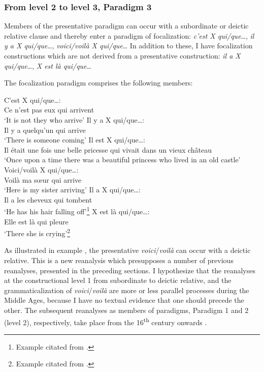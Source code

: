 \documentclass[output=paper]{langsci/langscibook}
\begin{document}
\subsubsection{From level 2 to level 3, Paradigm 3} \label{kragh:4.1.2.1}

Members of the presentative paradigm can occur with a subordinate or deictic relative clause and thereby enter a paradigm of focalization: \textit{c’est X qui/que}…, \textit{il y a X qui/que}…, \textit{voici/voilà X qui/que}… In addition to these, I have focalization constructions which are not derived from a presentative construction: \textit{il a X qui/que}…, \textit{X est là qui/que}…

The focalization paradigm comprises the following members:\largerpage


\ea\label{ex:kragh:22}C’est X qui/que…:\\ Ce n’est pas eux qui arrivent \\
    ‘It is not they who arrive’
\ex \label{ex:kragh:23}Il y a X qui/que…:\\ Il y a quelqu’un qui arrive\\
    ‘There is someone coming’
\ex\label{ex:kragh:24}Il est X qui/que…:\\ Il était une fois une belle pricesse qui vivait dans un vieux château\\
    ‘Once upon a time there was a beautiful princess who lived in an old castle’
\ex\label{ex:kragh:25}Voici/voilà X qui/que…:\\ Voilà ma sœur qui arrive\\
    ‘Here is my sister arriving’
\ex\label{ex:kragh:26}Il a X qui/que…:\\ Il a les cheveux qui tombent\\
    ‘He has his hair falling off’\footnote{Example citated from \citet{Conti2010}.}
\ex\label{ex:kragh:27}X est là qui/que…:\\ Elle est là qui pleure\\
    ‘There she is crying’\footnote{Example citated from \citet[104]{Furukawa2000}.}
\z

As illustrated in example , the presentative \textit{voici}/\textit{voilà} can occur with a deictic relative. This is a new reanalysis which presupposes a number of previous reanalyses, presented in the preceding sections. I hypothesize that the reanalyses at the constructional level 1 from subordinate to deictic relative, and the grammaticalization of \textit{voici}/\textit{voilà} are more or less parallel processes during the Middle Ages, because I have no textual evidence that one should precede the other. The subsequent reanalyses as members of paradigms, Paradigm 1 and 2 (level 2), respectively, take place from the 16\textsuperscript{th} century onwards \citep{OppermannMarsaux2006, KraghSchosler2015}.\largerpage
\end{document}
